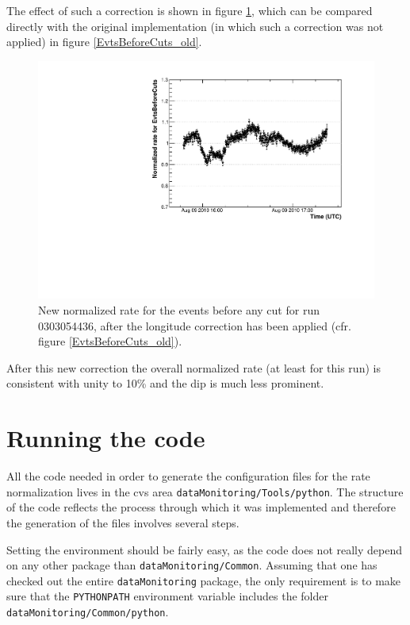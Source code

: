 \documentclass[a4paper,twocolumn]{article}
\begin{document}
The effect of such a correction is shown in figure \ref{EvtsBeforeCuts_new},
which can be compared directly with the original implementation (in which
such a correction was not applied) in figure \ref{EvtsBeforeCuts_old}.
\begin{figure}[htb!]
  \begin{center}
    \includegraphics[width=\linewidth]{figures/EvtsBeforeCuts_new}
    \caption{New normalized rate for the events before any cut for run
      0303054436, after the longitude correction has been applied (cfr.
      figure \ref{EvtsBeforeCuts_old}).}
    \label{EvtsBeforeCuts_new}
  \end{center}
\end{figure}

After this new correction the overall normalized rate (at least for this run)
is consistent with unity to 10\% and the dip is much less prominent.


\section{Running the code}

All the code needed in order to generate the configuration files for the
rate normalization lives in the cvs area \texttt{dataMonitoring/Tools/python}.
The structure of the code reflects the process through which it was implemented
and therefore the generation of the files involves several steps.

Setting the environment should be fairly easy, as the code does not
really depend on any other package than \texttt{dataMonitoring/Common}.
Assuming that one has checked out the entire \texttt{dataMonitoring} package,
the only requirement is to make sure that the \texttt{PYTHONPATH} environment
variable includes the folder \texttt{dataMonitoring/Common/python}.
\end{document}
